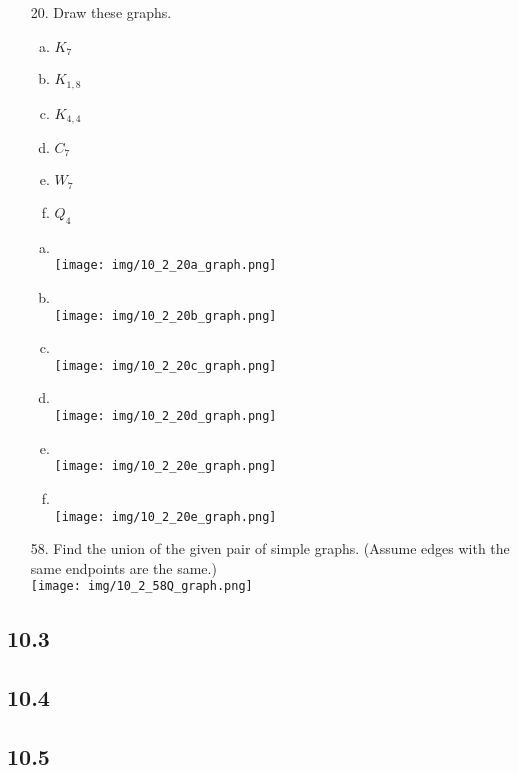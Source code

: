 \begin{itemize}
      \item[20.]  Draw these graphs.
            \begin{enumerate}[a.]
                  \item $K_7$
                  \item $K_{1,8}$
                  \item $K_{4,4}$
                  \item $C_7$
                  \item $W_7$
                  \item $Q_4$
            \end{enumerate}
            \answer
            \begin{enumerate}[a.]
                  \item \text{}\\
                        \texttt{[image: img/10\_2\_20a\_graph.png]}
                  \item \text{}\\
                        \texttt{[image: img/10\_2\_20b\_graph.png]}
                  \item \text{}\\
                        \texttt{[image: img/10\_2\_20c\_graph.png]}
                  \item \text{}\\
                        \texttt{[image: img/10\_2\_20d\_graph.png]}
                  \item \text{}\\
                        \texttt{[image: img/10\_2\_20e\_graph.png]}
                  \item \text{}\\ %
                        \texttt{[image: img/10\_2\_20e\_graph.png]}
            \end{enumerate}
      \item[58.] Find the union of the given pair of simple
            graphs. (Assume edges with the same endpoints are the same.) \\
            \texttt{[image: img/10\_2\_58Q\_graph.png]}



\end{itemize}

\subsection{10.3}

\subsection{10.4}

\subsection{10.5}
